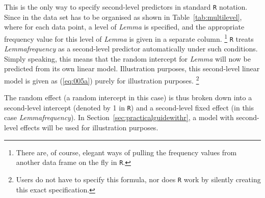 
This is the only way to specify second-level predictors in standard \texttt{R} notation.
Since in the data set has to be organised as shown in Table~\ref{tab:multilevel}, where for each data point, a level of \textit{Lemma} is specified, and the appropriate frequency value for this level of \textit{Lemma} is given in a separate column.%
\footnote{There are, of course, elegant ways of pulling the frequency values from another data frame on the fly in \texttt{R}.}
\texttt{R} treats \textit{Lemmafrequency} as a second-level predictor automatically under such conditions.
Simply speaking, this means that the random intercept for \textit{Lemma} will now be predicted from its own linear model.
Illustration purposes, this second-level linear model is given as (\ref{eq:005a}) purely for illustration purposes.%
\footnote{Users do not have to specify this formula, nor does \texttt{R} work by silently creating this exact specification.}


The random effect (a random intercept in this case) is thus broken down into a second-level intercept (denoted by 1 in \texttt{R}) and a second-level fixed effect (in this case \textit{Lemmafrequency}).
In Section~\ref{sec:practicalguidewithr}, a model with second-level effects will be used for illustration purposes.


